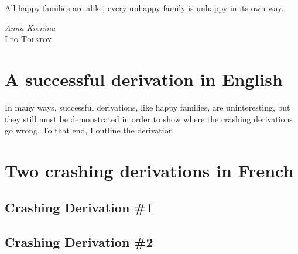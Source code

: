 \documentclass[MilwayThesis]{subfiles}
\begin{document}
\epigraph{All happy families are alike; every unhappy family is unhappy in its own way.}{\textit{Anna Krenina}\\\textsc{Leo Tolstoy}}
\section{A successful derivation in English}
In many ways, successful derivations, like happy families, are uninteresting, but they still must be demonstrated in order to show where the crashing derivations go wrong.
To that end, I outline the derivation
\section{Two crashing derivations in French}

\subsection{Crashing Derivation \#1}

\subsection{Crashing Derivation \#2}
\end{document}
